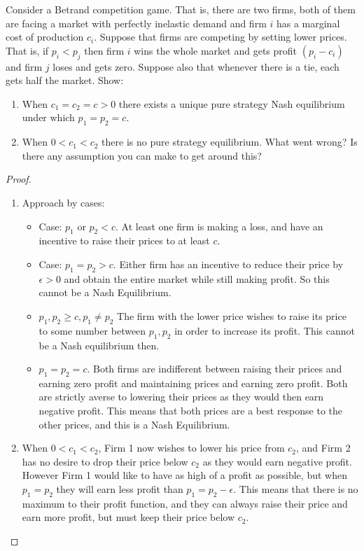 \documentclass[12pt, letterpaper]{paper}
\begin{document}
\begin{question}
  Consider a Betrand competition game. That is, there are two firms,
  both of them are facing a market with perfectly inelastic demand
  and firm $i$ has a marginal cost of production $c_i$. Suppose that
  firms are competing by setting lower prices. That is, if $p_i <
  p_j$ then firm $i$ wins the whole market and gets profit $(p_i -
  c_i)$ and firm $j$ loses and gets zero. Suppose also that whenever
  there is a tie, each gets half the market. Show:
  \begin{enumerate}
  \item When $c_1 = c_2 = c > 0$ there exists a unique pure strategy
    Nash equilibrium under which $p_1 = p_2 = c$.
    
  \item When $0 < c_1 < c_2$ there is no pure strategy
    equilibrium. What went wrong? Is there any assumption you can make
    to get around this?
  \end{enumerate}
  \begin{proof}
    \begin{enumerate}
    \item Approach by cases:
      \begin{itemize}
      \item Case: $p_1$ or  $p_2 < c$. At least one firm is making a loss, and
        have an incentive to raise their prices to at least $c$.
      \item Case: $p_1 = p_2 > c$. Either firm has an incentive to
        reduce their price by $\epsilon > 0$ and obtain the entire market
        while still making profit. So this cannot be a Nash
        Equilibrium.
      \item $p_1, p_2 \geq c, p_1 \neq p_2$ The firm with the lower price
        wishes to raise its price to some number between $p_1, p_2$ in
        order to increase its profit. This cannot be a Nash
        equilibrium then.
      \item $p_1 = p_2 = c$. Both firms are indifferent between
        raising their prices and earning zero profit and maintaining
        prices and earning zero profit. Both are strictly averse to
        lowering their prices as they would then earn negative
        profit. This means that both prices are a best response to the
        other prices, and this is a Nash Equilibrium.
      \end{itemize}
    \item When $0 < c_1 < c_2$, Firm 1 now wishes to lower his price
      from $c_2$, and Firm 2 has no desire to drop their price below
      $c_2$ as they would earn negative profit. However Firm 1 would
      like to have as high of a profit as possible, but when $p_1 =
      p_2$ they will earn less profit than $p_1 = p_2 - \epsilon$. This means
      that there is no maximum to their profit function, and they can
      always raise their price and earn more profit, but must keep
      their price below $c_2$. 


\end{enumerate}
\end{proof}
\end{question}
\end{document}
